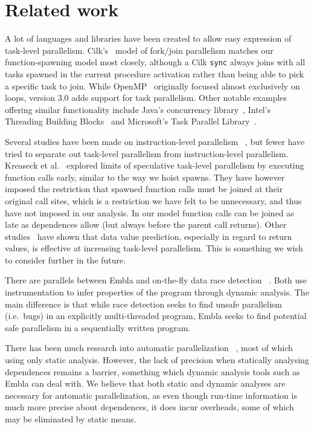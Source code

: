 \section{Related work}

A lot of languages and libraries have been created to allow easy
expression of task-level parallelism.  Cilk's~\cite{blumofe96cilk}
model of fork/join parallelism matches our function-spawning model
most closely, although a Cilk {\tt sync} always joins with all tasks 
spawned in the current procedure activation rather than being able to 
pick a specific task to join. While OpenMP~\cite{dagum98openmp} 
originally focused almost exclusively on loops, version 3.0 adds 
support for task parallelism.  Other notable examples
offering similar functionality 
include Java's concurrency library~\cite{lea00java}, Intel's
Threading Building Blocks~\cite{reinders07intel} and Microsoft's
Task Parallel Library~\cite{leijen07parallel}.

Several studies have been made on instruction-level parallelism~
\cite{wall91limits, postiff99limits, austin92dynamic, lam92limits,
mak09limits}, but fewer have tried to separate out task-level
parallelism from instruction-level parallelism.  Kreaseck et al.\
 explored limits of speculative task-level
parallelism by executing function calls early, similar to the
way we hoist spawns.  They have however imposed the restriction that
spawned function calls must be joined at their original call sites,
which is a restriction we have felt to be unnecessary, and thus have
not imposed in our analysis.  In our model function calls can be
joined as late as dependences allow (but always before the parent
call returns).  Other studies~\cite{warg01limits, oplinger99insearch}
have shown that data value prediction, especially in regard to return
values, is effective at increasing task-level parallelism.  This is
something we wish to consider further in the future.

There are parallels between Embla and on-the-fly data race detection~
\cite{MellorCrummey91onthefly, ha02space, savage97eraser}.  Both use
instrumentation to infer properties of the program through dynamic
analysis.  The main difference is that while race detection seeks to
find unsafe parallelism (i.e.\ bugs) in an explicitly multi-threaded
program, Embla seeks to find potential safe parallelism in a
sequentially written program.

There has been much research into automatic parallelization~
\cite{kennedy02optimizing, Blume94polaris, ottoni05automatic,
ottoni07global}, most of which using only static analysis.  However,
the lack of precision when statically analysing dependences remains a
barrier, something which dynamic analysis tools such as Embla can deal
with.  We believe that both static and dynamic analyses are necessary
for automatic parallelization, as even though run-time information is
much more precise about dependences, it does incur overheads, some of
which may be eliminated by static means.

